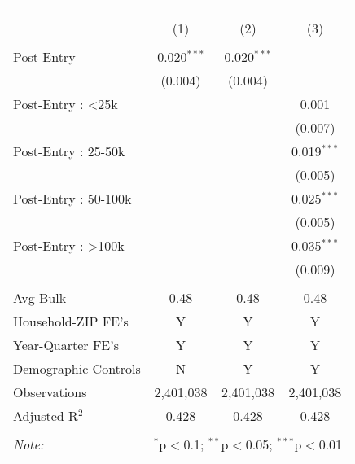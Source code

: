 
\begin{table}[!htbp] \centering 
  \caption{} 
  \label{} 
\begin{tabular}{@{\extracolsep{5pt}}lccc} 
\\[-1.8ex]\hline 
\hline \\[-1.8ex] 
\\[-1.8ex] & (1) & (2) & (3)\\ 
\hline \\[-1.8ex] 
 Post-Entry & 0.020$^{***}$ & 0.020$^{***}$ &  \\ 
  & (0.004) & (0.004) &  \\ 
  Post-Entry : <25k &  &  & 0.001 \\ 
  &  &  & (0.007) \\ 
  Post-Entry : 25-50k &  &  & 0.019$^{***}$ \\ 
  &  &  & (0.005) \\ 
  Post-Entry : 50-100k &  &  & 0.025$^{***}$ \\ 
  &  &  & (0.005) \\ 
  Post-Entry : >100k &  &  & 0.035$^{***}$ \\ 
  &  &  & (0.009) \\ 
 \hline \\[-1.8ex] 
Avg Bulk & 0.48 & 0.48 & 0.48 \\ 
Household-ZIP FE's & Y & Y & Y \\ 
Year-Quarter FE's & Y & Y & Y \\ 
Demographic Controls & N & Y & Y \\ 
Observations & 2,401,038 & 2,401,038 & 2,401,038 \\ 
Adjusted R$^{2}$ & 0.428 & 0.428 & 0.428 \\ 
\hline 
\hline \\[-1.8ex] 
\textit{Note:}  & \multicolumn{3}{l}{$^{*}$p$<$0.1; $^{**}$p$<$0.05; $^{***}$p$<$0.01} \\ 
\end{tabular} 
\end{table} 
